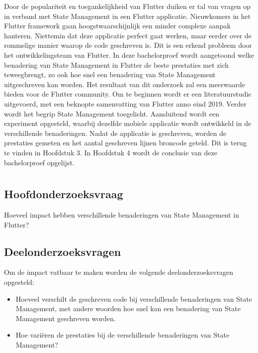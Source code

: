 Door de populariteit en toegankelijkheid van Flutter duiken er tal van vragen op in verband met State Management in een Flutter applicatie. Nieuwkomers in het Flutter framework gaan hoogstwaarschijnlijk een minder complexe aanpak hanteren. Niettemin dat deze applicatie perfect gaat werken, maar eerder over de rommelige manier waarop de code geschreven is. Dit is een erkend probleem door het ontwikkelingsteam van Flutter.
\newline
In deze bachelorproef wordt aangetoond welke benadering van State Management in Flutter de beste prestaties met zich teweegbrengt, zo ook hoe snel een benadering van State Management uitgeschreven kan worden. Het resultaat van dit onderzoek zal een meerwaarde bieden voor de Flutter community. Om te beginnen wordt er een literatuurstudie uitgevoerd, met een beknopte samenvatting van Flutter anno eind 2019. Verder wordt het begrip State Management toegelicht. Aansluitend wordt een experiment opgesteld, waarbij dezelfde mobiele applicatie wordt ontwikkeld in de verschillende benaderingen. Nadat de applicatie is geschreven, worden de prestaties gemeten en het aantal geschreven lijnen broncode geteld. Dit is terug te vinden in Hoofdstuk 3.
\newline
In Hoofdstuk 4 wordt de conclusie van deze bachelorproef opgelijst.

\section{}
\label{sec:onderzoeksvraag}

\subsection{Hoofdonderzoeksvraag}
Hoeveel impact hebben verschillende benaderingen van State Management in Flutter?

\subsection{Deelonderzoeksvragen}
Om de impact vatbaar te maken worden de volgende deelonderzoeksvragen opgesteld:
\begin{itemize}
    \item Hoeveel verschilt de geschreven code bij verschillende benaderingen van State Management, met andere woorden
    hoe snel kan een benadering van State Management geschreven worden.
    \item{Hoe variëren de prestaties bij de verschillende benaderingen van State Management?}
\end{itemize}

